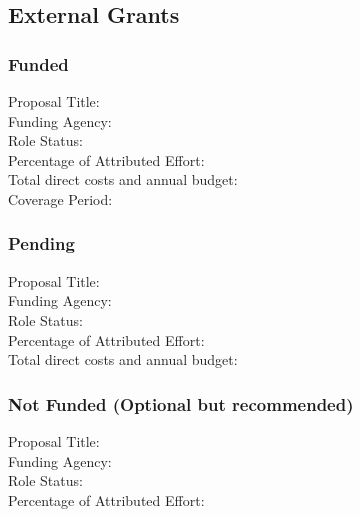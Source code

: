 \documentclass[a4paper,9pt]{extarticle}
\newenvironment{subs} %
  {\adjustwidth{2em}{0pt}}
  {\endadjustwidth}
\begin{document}
    \subsection*{External Grants}
    \begin{subs}
        \subsubsection*{Funded}
            Proposal Title: \\
            Funding Agency: \\
            Role Status: \\
            Percentage of Attributed Effort: \\
            Total direct costs and annual budget:\\
            Coverage Period:
        \subsubsection*{Pending}
            Proposal Title:\\
            Funding Agency:\\
            Role Status: \\
            Percentage of Attributed Effort: \\
            Total direct costs and annual budget:
        \subsubsection*{Not Funded (Optional but recommended)}
            Proposal Title:\\
            Funding Agency:\\
            Role Status: \\
            Percentage of Attributed Effort: 
    \end{subs}
\end{document}

